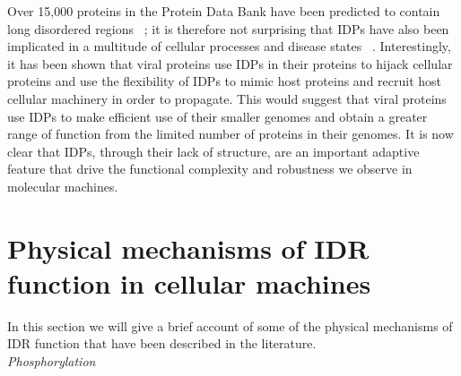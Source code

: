Over 15,000 proteins in the Protein Data Bank have been predicted to contain long disordered regions ~\cite{romero1998thousands}; it is therefore not surprising that  IDPs have also been implicated  in a multitude of cellular processes and disease states ~\cite{uversky2008intrinsically}.  Interestingly, it has been shown that viral proteins use IDPs in their proteins to hijack cellular proteins and use the flexibility of IDPs to mimic host proteins and recruit host cellular machinery in order to propagate.\cite{davey2011viruses} This would suggest that viral proteins use IDPs to make efficient use of their smaller genomes and obtain a greater range of function from the limited number of proteins in their genomes. It is now clear that IDPs, through their lack of structure, are an important adaptive feature that drive the functional complexity and robustness we observe in molecular machines. \\

\section{Physical mechanisms of IDR function in cellular machines}

In this section we will give a brief account of some of the physical mechanisms of IDR function that have been described in the literature. \\

{\it Phosphorylation}

